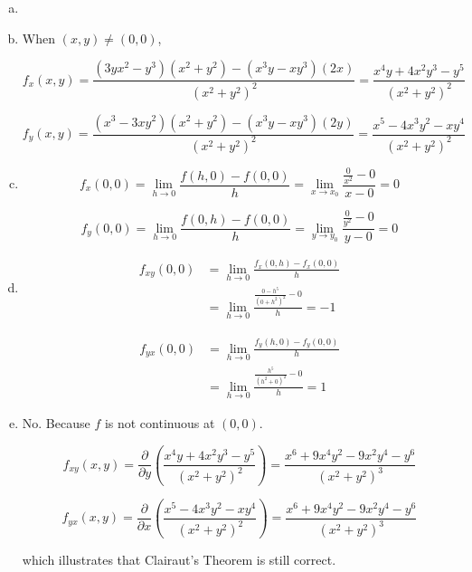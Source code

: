 \documentclass{article}
\begin{document}
    \begin{enumerate}[(a)]
        \item 
        \item 

        When $(x, y) \not = (0, 0)$,

        $$f_x(x, y) = \frac{(3yx^2 - y^3)(x^2+y^2) - (x^3y-xy^3)(2x)}{(x^2+y^2)^2} = \frac{x^4y + 4x^2y^3 - y^5 }{(x^2+y^2)^2}$$

        $$f_y(x, y) = \frac{(x^3-3xy^2)(x^2+y^2) - (x^3y-xy^3)(2y)}{(x^2+y^2)^2} = \frac{x^5 - 4x^3y^2 - xy^4}{(x^2+y^2)^2}$$

        \item 

        $$f_x(0, 0) = \lim_{h \to 0}\frac{f(h, 0) - f(0, 0)}{h} = \lim_{x\to x_0} \frac{\frac{0}{x^2} - 0}{x - 0} = 0$$

        $$f_y(0, 0) = \lim_{h \to 0}\frac{f(0, h) - f(0, 0)}{h} = \lim_{y \to y_0} \frac{\frac{0}{y^2} - 0}{y - 0} = 0$$
        
        \item 

        $$\begin{aligned}
            f_{xy}(0, 0) &= \lim_{h \to 0}\frac{f_x(0, h) - f_x(0, 0)}{h} \\
            &= \lim_{h \to 0}\frac{\frac{0 - h^5}{(0+h^2)^2} - 0}{h} = -1
        \end{aligned}$$

        $$\begin{aligned}
            f_{yx}(0, 0) &= \lim_{h \to 0}\frac{f_y(h, 0) - f_y(0, 0)}{h} \\
            &= \lim_{h \to 0}\frac{\frac{h^5}{(h^2+0)^2} - 0}{h} = 1
        \end{aligned}$$
        
        \item 

        No. Because $f$ is not continuous at $(0, 0)$.

        $$f_{xy}(x, y) = \frac{\partial }{\partial y}(\frac{x^4y + 4x^2y^3 - y^5 }{(x^2+y^2)^2}) = \frac{x^6+9x^4y^2 - 9x^2y^4 - y^6}{(x^2+y^2)^3}$$

        $$f_{yx}(x, y) = \frac{\partial}{\partial x}(\frac{x^5 - 4x^3y^2 - xy^4}{(x^2+y^2)^2}) = \frac{x^6 + 9x^4y^2 - 9x^2y^4 - y^6}{(x^2+y^2)^3}$$

        which illustrates that Clairaut's Theorem is still correct.

    \end{enumerate}
\end{document}
